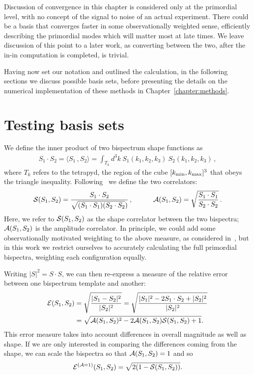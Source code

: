 Discussion of convergence in this chapter is considered only at the primordial level,
with no concept of the signal to noise of an actual experiment.
There could be a basis that converges faster in some observationally weighted sense,
efficiently describing the primordial modes which will matter most at late times.
We leave discussion of this point to a later work, as converting between the two,
after the in-in computation is completed, is trivial.


Having now set our notation and outlined the calculation, in the following sections we
discuss possible basis sets, before presenting the details on
the numerical implementation of these methods in Chapter~\ref{chapter:methods}.


\section{Testing basis sets}\label{sec:inner_product}
We define the inner product of two bispectrum shape functions as
\begin{align}
    S_1\cdot S_2  = \langle S_1\,, S_2 \rangle = \int_{T_k} d^3k \: S_1(k_1,k_2,k_3) \: S_2(k_1,k_2,k_3)\,,\label{inner_prod}
\end{align}
where $T_k$ refers to the tetrapyd, the region of the cube $[{k_\text{min}},{k_\text{max}}]^3$ that obeys the triangle inequality.
Following~\cite{hung_1902}
we define the two correlators:
\begin{align}
    \mathcal{S}(S_1,S_2) = \frac{S_1\cdot S_2}{\sqrt{(S_1\cdot S_1)(S_2\cdot S_2})}\,, \qquad\quad 
\mathcal{A}(S_1,S_2) = \sqrt{\frac{S_1\cdot S_1}{S_2\cdot S_2}}\,.
\end{align}
Here, we refer to $\mathcal{S}(S_1,S_2)$ as the shape correlator between the two bispectra;
$\mathcal{A}(S_1,S_2)$ is the amplitude correlator.
In principle, we could add some observationally motivated weighting
to the above measure, as considered in~\cite{FergShell_1,FergShell_2,FergShell_3},
but in this work we restrict ourselves to accurately calculating the
full primordial bispectra, weighting each configuration equally.

Writing $|S|^2=S\cdot S$,
we can then re-express a measure of the relative error
between one bispectrum template and another:
\begin{align}\label{relative_difference}
\mathcal{E}(S_1,S_2) &= \sqrt{\frac{|S_1-S_2|^2}{|S_2|^2}}  = \sqrt{\frac{|S_1|^2-2S_1\cdot S_2+|S_2|^2}{|S_2|^2}}\nonumber\\
	   &= \sqrt{\mathcal{A}(S_1,S_2)^2-2\mathcal{A}(S_1,S_2)\mathcal{S}(S_1,S_2)+1}.
\end{align}
This error measure takes into account differences in overall magnitude as well as shape.
If we are only interested in comparing the differences coming from the shape,
we can scale the bispectra so that $\mathcal{A}(S_1,S_2)=1$ and so
\begin{align}\label{relative_difference_scaled}
    \mathcal{E}^{(\mathcal{A}=1)}(S_1,S_2) = \sqrt{2(1-\mathcal{S}(S_1,S_2))}.
\end{align}


